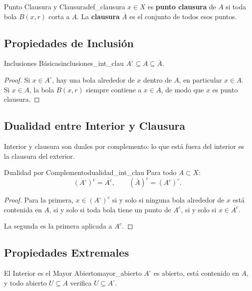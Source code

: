 \documentclass[11pt, a4paper]{article}
\begin{document}
\begin{definicion}{Punto Clausura y Clausura}{def_clausura}
$x \in X$ es \textbf{punto clausura} de $A$ si toda bola $B(x, r)$ corta a $A$. La \textbf{clausura}
$\overline{A}$ es el conjunto de todos esos puntos.
\end{definicion}

\subsection{Propiedades de Inclusión}

\begin{proposicion}{Inclusiones Básicas}{inclusiones_int_clau}
$A^\circ \subseteq A \subseteq \overline{A}$.
\end{proposicion}

\begin{proof}
Si $x \in A^\circ$, hay una bola alrededor de $x$ dentro de $A$, en particular $x \in A$. Si
$x \in A$, la bola $B(x,r)$ siempre contiene a $x \in A$, de modo que $x$ es punto clausura.
\end{proof}

\subsection{Dualidad entre Interior y Clausura}

Interior y clausura son duales por complemento: lo que está fuera del interior es la clausura del
exterior.

\begin{proposicion}{Dualidad por Complemento}{dualidad_int_clau}
Para todo $A \subset X$:
$$ (A^\circ)^c = \overline{A^c}, \qquad (\overline{A})^c = (A^c)^\circ. $$
\end{proposicion}

\begin{proof}
Para la primera, $x \in (A^\circ)^c$ si y solo si ninguna bola alrededor de $x$ está contenida en
$A$, si y solo si toda bola tiene un punto de $A^c$, si y solo si $x \in \overline{A^c}$.

La segunda es la primera aplicada a $A^c$.
\end{proof}

\subsection{Propiedades Extremales}

\begin{proposicion}{El Interior es el Mayor Abierto}{mayor_abierto}
$A^\circ$ es abierto, está contenido en $A$, y todo abierto $U \subseteq A$ verifica
$U \subseteq A^\circ$.
\end{proposicion}
\end{document}
